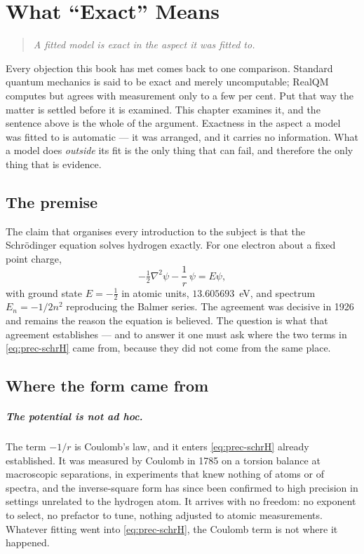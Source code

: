 \chapter{What ``Exact'' Means}\label{ch:precision}

\begin{quote}
\itshape A fitted model is exact in the aspect it was fitted to.
\end{quote}
\bigskip

Every objection this book has met comes back to one comparison. Standard quantum mechanics is said
to be exact and merely uncomputable; RealQM computes but agrees with measurement only to a few per
cent. Put that way the matter is settled before it is examined. This chapter examines it, and the
sentence above is the whole of the argument. Exactness in the aspect a model was fitted to is
automatic --- it was arranged, and it carries no information. What a model does \emph{outside} its
fit is the only thing that can fail, and therefore the only thing that is evidence.

\section{The premise}\label{sec:prec-premise}

The claim that organises every introduction to the subject is that the Schr\"odinger equation
solves hydrogen exactly. For one electron about a fixed point charge,
\begin{equation}
-\tfrac12\nabla^2\psi - \frac{1}{r}\,\psi = E\psi,
\label{eq:prec-schrH}
\end{equation}
with ground state $E=-\tfrac12$ in atomic units, $13.605693$~eV, and spectrum $E_n = -1/2n^2$
reproducing the Balmer series. The agreement was decisive in 1926 and remains the reason the
equation is believed. The question is what that agreement establishes --- and to answer it one must
ask where the two terms in \eqref{eq:prec-schrH} came from, because they did not come from the same
place.

\section{Where the form came from}\label{sec:prec-form}

\paragraph{The potential is not ad hoc.}
The term $-1/r$ is Coulomb's law, and it enters \eqref{eq:prec-schrH} already established. It was
measured by Coulomb in 1785 on a torsion balance at macroscopic separations, in experiments that
knew nothing of atoms or of spectra, and the inverse-square form has since been confirmed to high
precision in settings unrelated to the hydrogen atom. It arrives with no freedom: no exponent to
select, no prefactor to tune, nothing adjusted to atomic measurements. Whatever fitting went into
\eqref{eq:prec-schrH}, the Coulomb term is not where it happened.

